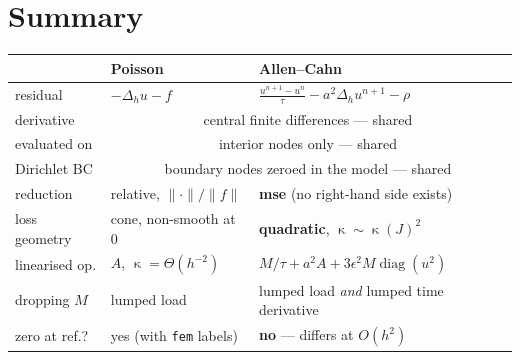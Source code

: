 \documentclass[11pt]{article}
\newcommand{\dt}{\tau}
\DeclareMathOperator{\cond}{\kappa}
\begin{document}
\section{Summary}

\begin{center}
\begin{tabular}{lll}
\toprule
& Poisson & Allen--Cahn \\
\midrule
residual        & $-\Delta_h u - f$        & $\frac{u^{n+1}-u^n}{\dt} - a^2\Delta_h u^{n+1} - \rho$ \\
derivative      & \multicolumn{2}{c}{central finite differences --- shared} \\
evaluated on    & \multicolumn{2}{c}{interior nodes only --- shared} \\
Dirichlet BC    & \multicolumn{2}{c}{boundary nodes zeroed in the model --- shared} \\
reduction       & relative, $\|\cdot\|/\|f\|$ & \textbf{mse} (no right-hand side exists) \\
loss geometry   & cone, non-smooth at 0     & \textbf{quadratic}, $\cond \sim \cond(J)^2$ \\
linearised op.  & $A$, $\cond=\Theta(h^{-2})$ & $M/\dt + a^2A + 3\epsilon^2M\!\operatorname{diag}(u^2)$ \\
dropping $M$    & lumped load               & lumped load \emph{and} lumped time derivative \\
zero at ref.?   & yes (with \texttt{fem} labels) & \textbf{no} --- differs at $O(h^2)$ \\
\bottomrule
\end{tabular}
\end{center}
\end{document}
